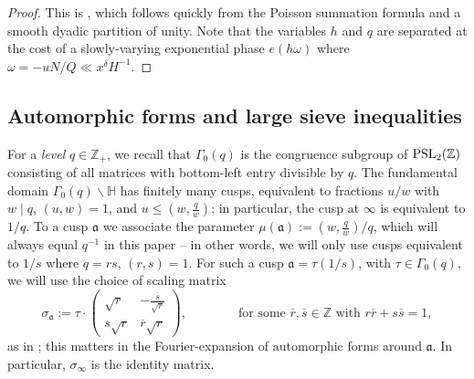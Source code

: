 \documentclass[reqno,11pt]{amsart}
\theoremstyle{remark}
\numberwithin{equation}{section}
\newcommand{\Z}{\mathbb{Z}}
\renewcommand{\H}{\mathbb{H}}
\newcommand{\ma}{\mathfrak{a}}
\newcommand{\PSL}{\textnormal{PSL}}
\renewcommand{\bar}{\overline}
\begin{document}
\begin{proof}
This is \cite[Lemma 4]{pascadi2024large}, which follows quickly from the Poisson summation formula and a smooth dyadic partition of unity. Note that the variables $h$ and $q$ are separated at the cost of a slowly-varying exponential phase $e(h\omega)$ where $\omega = -uN/Q \ll x^\delta H^{-1}$.
\end{proof}




\subsection{Automorphic forms and large sieve inequalities} \label{subsec:automorphic-large-sieve}

For a \emph{level} $q \in \Z_+$, we recall that $\Gamma_0(q)$ is the congruence subgroup of $\PSL_2(\Z)$ consisting of all matrices with bottom-left entry divisible by $q$. The fundamental domain $\Gamma_0(q)\backslash \H$ has finitely many cusps, equivalent to fractions $u/w$ with $w \mid q$, $(u, w) = 1$, and $u \le (w, \tfrac{q}{w})$; in particular, the cusp at $\infty$ is equivalent to $1/q$. To a cusp $\ma$ we associate the parameter $\mu(\ma) := (w, \tfrac{q}{w})/q$, which will always equal $q^{-1}$ in this paper -- in other words, we will only use cusps equivalent to $1/s$ where $q = rs$, $(r, s) = 1$. For such a cusp $\ma = \tau(1/s)$, with $\tau \in \Gamma_0(q)$, we will use the choice of scaling matrix 
\begin{equation} \label{eq:scaling-choices}
    \sigma_{\ma} := \tau \cdot \begin{pmatrix} 
    \sqrt{r} & -\frac{\bar{s}}{\sqrt{r}} \\
    s\sqrt{r} & \bar{r}\sqrt{r}
    \end{pmatrix},
    \qquad\qquad 
    \text{for some } \bar{r}, \bar{s} \in \Z \text{ with }
    r\bar{r} + s\bar{s} = 1,
\end{equation}
as in \cite[(3.9)]{pascadi2024large}; this matters in the Fourier-expansion of automorphic forms around $\ma$. In particular, $\sigma_\infty$ is the identity matrix.
\end{document}
